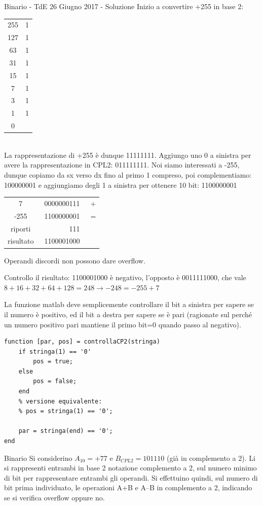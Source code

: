 \documentclass[handout]{beamer}
\begin{document}
\begin{frame}{Binario - TdE 26 Giugno 2017 - Soluzione}
	\framebreak
	Inizio a convertire +255 in base 2:
	\begin{tabular}{c|c}
		255 & 1\\
		127 & 1\\
		63 & 1\\
		31 & 1\\
		15 & 1\\
		7 & 1\\
		3 & 1\\
		1 & 1\\
		0 & 
	\end{tabular}\\
\small
	La rappresentazione di +255 è dunque 11111111. Aggiungo uno 0 a sinistra per avere la rappresentazione in CPL2: 011111111. Noi siamo interessati a -255, dunque copiamo da sx verso dx fino al primo 1 compreso, poi complementiamo: 100000001 e aggiungiamo degli 1 a sinistra per ottenere 10 bit: 1100000001
	
	\framebreak
	
	\begin{tabular}{cc|c}
		7			& 0000000111 & + \\
	    -255		& 1100000001 & = \\
		riporti		& \ \ \ \ \ \ \ \ 111\ &  \\
		\hline
		risultato	& 1100001000 &  \\
	\end{tabular}

	Operandi discordi non possono dare overflow.
	
	Controllo il risultato: 1100001000 è negativo, l'opposto è 0011111000, che vale $8+16+32+64+128 = 248 \rightarrow -248 = -255+7$
	
	\framebreak
	
	La funzione matlab deve semplicemente controllare il bit a sinistra per sapere se il numero è positivo, ed il bit a destra per sapere se è pari (ragionate sul perché un numero positivo pari mantiene il primo bit=0 quando passo al negativo).
	\begin{lstlisting}
function [par, pos] = controllaCP2(stringa)
	if stringa(1) == '0'
		pos = true;
	else
		pos = false;
	end
	% versione equivalente:
	% pos = stringa(1) == '0';
	
	par = stringa(end) == '0';
end
\end{lstlisting}
	

\end{frame}

\begin{frame}{Binario}
	Si considerino $A_{10} = +77$ e $B_{CPL2} = 101110$ (già in complemento a 2). Li si rappresenti entrambi in base 2 notazione complemento a 2, sul numero \alert{minimo} di bit per rappresentare \alert{entrambi} gli operandi. Si effettuino quindi, sul numero di bit prima individuato, le
	operazioni A+B e A–B in complemento a 2, indicando se si verifica overflow oppure no.
\end{frame}
\end{document}
